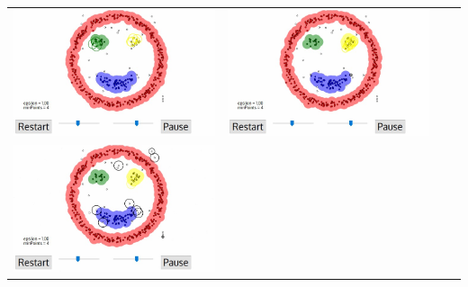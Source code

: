 \documentclass{beamer}
\begin{document}
\begin{frame}
{\begin{tabular}{cccc}
		\includegraphics[scale=0.15]{dbscan/5}&
		\includegraphics[scale=0.15]{dbscan/6}\\
		\includegraphics[scale=0.15]{dbscan/7}&

\end{tabular}}
\end{frame}
\end{document}
